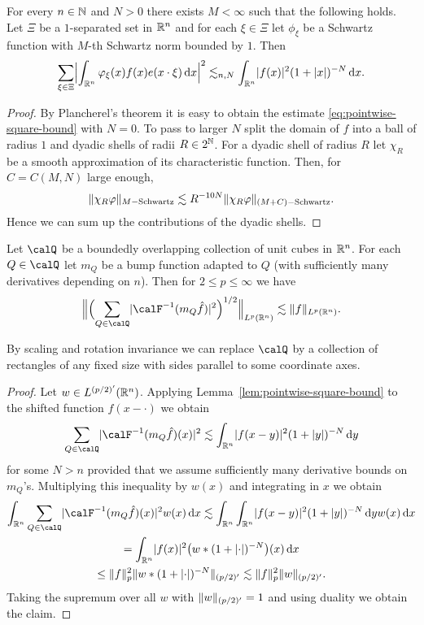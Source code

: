 \begin{lemma}
\label{lem:pointwise-square-bound}
For every $n\in\mathbb{N}$ and $N>0$ there exists $M<\infty$ such that the following holds.
Let $\Xi$ be a $1$-separated set in $\mathbb{R}^{n}$ and for each $\xi\in\Xi$ let $\phi_{\xi}$ be a Schwartz function with $M$-th Schwartz norm bounded by $1$.
Then
\begin{equation}
\label{eq:pointwise-square-bound}
\sum_{\xi\in\Xi} \abs[\Big]{ \int_{\R^{n}} \phi_{\xi}(x) f(x) e(x\cdot \xi) \dif x }^{2}
\lesssim_{n,N}
\int_{\R^{n}} \abs{f(x)}^{2} (1+\abs{x})^{-N} \dif x.
\end{equation}
\end{lemma}
\begin{proof}
By Plancherel's theorem it is easy to obtain the estimate \eqref{eq:pointwise-square-bound} with $N=0$.
To pass to larger $N$ split the domain of $f$ into a ball of radius $1$ and dyadic shells of radii $R\in 2^{\mathbb{N}}$.
For a dyadic shell of radius $R$ let $\chi_{R}$ be a smooth approximation of its characteristic function.
Then, for $C=C(M,N)$ large enough,
\[
\lVert \chi_{R}\varphi \rVert_{M-\mathrm{Schwartz}}
\lesssim
R^{-10 N} \lVert \chi_{R}\varphi \rVert_{(M+C)-\mathrm{Schwartz}}.
\]
Hence we can sum up the contributions of the dyadic shells.
\end{proof}
\begin{corollary}
\label{lem:square-fct-congruent-cubes}
Let $\calQ$ be a boundedly overlapping collection of unit cubes in $\mathbb{R}^{n}$.
For each $Q\in\calQ$ let $m_{Q}$ be a bump function adapted to $Q$ (with sufficiently many derivatives depending on $n$).
Then for $2 \leq p \leq \infty$ we have
\[
\norm[\Big]{ \Bigl( \sum_{Q\in\calQ} \abs{\calF^{-1}(m_{Q} \hat{f})}^{2} \Bigr)^{1/2} }_{L^{p}(\R^{n})}
\lesssim
\norm{ f }_{L^{p}(\R^{n})}.
\]
\end{corollary}
By scaling and rotation invariance we can replace $\calQ$ by a collection of rectangles of any fixed size with sides parallel to some coordinate axes.
\begin{proof}
Let $w \in L^{(p/2)'}(\mathbb{R}^{n})$.
Applying Lemma~\ref{lem:pointwise-square-bound} to the shifted function $f(x-\cdot)$ we obtain
\[
\sum_{Q\in\calQ} \abs{\calF^{-1}(m_{Q} \hat{f})(x)}^{2}
\lesssim
\int_{\R^{n}} \abs{f(x-y)}^{2} (1+\abs{y})^{-N} \dif y
\]
for some $N>n$ provided that we assume sufficiently many derivative bounds on $m_{Q}$'s.
Multiplying this inequality by $w(x)$ and integrating in $x$ we obtain
\begin{multline*}
\int_{\R^{n}} \sum_{Q\in\calQ} \abs{\calF^{-1}(m_{Q} \hat{f})(x)}^{2} w(x) \dif x
\lesssim
\int_{\R^{n}} \int_{\R^{n}} \abs{f(x-y)}^{2} (1+\abs{y})^{-N} \dif y w(x) \dif x\\
=
\int_{\R^{n}} \abs{f(x)}^{2} \bigl( w * (1+\abs{\cdot})^{-N} \bigr)(x) \dif x\\
\leq
\norm{f}_{p}^{2} \norm{ w * (1+\abs{\cdot})^{-N} }_{(p/2)'}
\lesssim
\norm{f}_{p}^{2} \norm{ w }_{(p/2)'}.
\end{multline*}
Taking the supremum over all $w$ with $\lVert w \rVert_{(p/2)'}=1$ and using duality we obtain the claim.
\end{proof}


